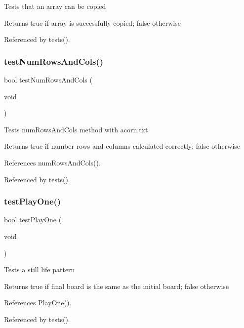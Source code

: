 Tests that an array can be copied \begin{DoxyReturn}{Returns}
true if array is successfully copied; false otherwise 
\end{DoxyReturn}


Referenced by tests().

\mbox{\label{tests_8c_a030c56f9df10719a01799a53880587bd}} 
\subsubsection{test\+Num\+Rows\+And\+Cols()}
{\footnotesize\ttfamily bool test\+Num\+Rows\+And\+Cols (\begin{DoxyParamCaption}\item[{void}]{ }\end{DoxyParamCaption})}

Tests num\+Rows\+And\+Cols method with acorn.\+txt \begin{DoxyReturn}{Returns}
true if number rows and columns calculated correctly; false otherwise 
\end{DoxyReturn}


References num\+Rows\+And\+Cols().



Referenced by tests().

\mbox{\label{tests_8c_aa4c8095a20d90a18d843ab63ecd02d00}} 
\subsubsection{test\+Play\+One()}
{\footnotesize\ttfamily bool test\+Play\+One (\begin{DoxyParamCaption}\item[{void}]{ }\end{DoxyParamCaption})}

Tests a still life pattern \begin{DoxyReturn}{Returns}
true if final board is the same as the initial board; false otherwise 
\end{DoxyReturn}


References Play\+One().



Referenced by tests().

\mbox{\label{tests_8c_a47e8ad22bc283ef5aee41bf4b127abd4}} 
